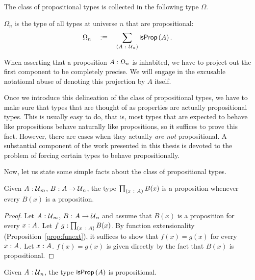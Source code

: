 The class of propositional types is collected in the following type $\Omega$.
\begin{defn}[$\Omega$]
  $\Omega_n$ is the type of all types at universe $n$ that are propositional:
  \begin{equation*}
    \Omega_n \quad:\equiv\quad \sum_{(A~:~\mathcal{U}{}_n)} \mathsf{isProp}\left(A\right).
  \end{equation*}
\end{defn}

When asserting that a proposition $A\hspace{0.1mm}:\hspace{0.1mm}\Omega_n$ is inhabited, we have to project out
the first component to be completely precise. We will engage in the excusable notational
abuse of denoting this projection by $A$ itself.

Once we introduce this delineation of the class of propositional types, we have to make
sure that types that are thought of as properties are actually propositional types. This
is usually easy to do, that is, most types that are expected to behave like propositions
behave naturally like propositions, so it suffices to prove this fact. However, there are
cases when they actually \emph{are not} propositional. A substantial component of the work
presented in this thesis is devoted to the problem of forcing certain types to behave
propositionally.

Now, let us state some simple facts about the class of propositional types.

\begin{prop}\label{prop:pi-prop}
  Given $A\hspace{0.1mm}:\hspace{0.1mm}\mathcal{U}{}_m$, $B\hspace{0.1mm}:\hspace{0.1mm}A \rightarrow \mathcal{U}{}_n$, the type $\prod_{(x~:~A)} B(x)$
  is a proposition whenever every $B(x)$ is a proposition.
\end{prop}
\begin{proof}
  Let $A\hspace{0.1mm}:\hspace{0.1mm}\mathcal{U}{}_m$, $B\hspace{0.1mm}:\hspace{0.1mm}A \rightarrow \mathcal{U}{}_n$ and assume that $B(x)$ is a
  proposition for every $x\hspace{0.1mm}:\hspace{0.1mm}A$. Let $f~g:\prod_{(x~:~A)} B(x)$. By
  function extensionality (Proposition~\ref{prop:funext}), it suffices to show that $f(x)
  = g(x)$ for every $x\hspace{0.1mm}:\hspace{0.1mm}A$. Let $x\hspace{0.1mm}:\hspace{0.1mm}A$. $f(x) = g(x)$ is given directly by
  the fact that $B(x)$ is propositional.
\end{proof}

\begin{prop}
  Given $A\hspace{0.1mm}:\hspace{0.1mm}\mathcal{U}{}_n$, the type $\mathsf{isProp}\left(A\right)$ is propositional.
\end{prop}

